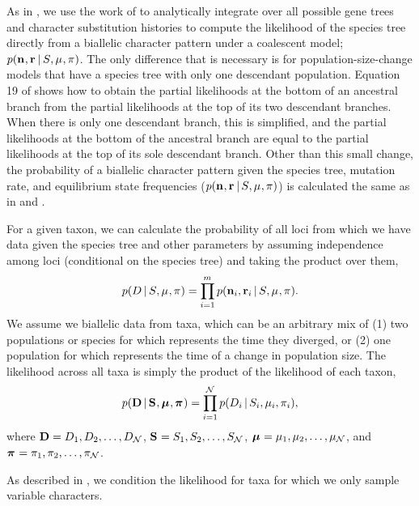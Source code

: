 As in \citet{Oaks2018ecoevolity},
we use the work of \citet{Bryant2012}
to analytically integrate over all possible gene trees and
character substitution histories to compute the likelihood
of the species tree directly from 
a biallelic character pattern under a coalescent model;
$\pr(\leafallelecounts, \leafredallelecounts \given \sptree, \murate, \gfreq)$.
The only difference that is necessary is for population-size-change models that
have a species tree with only one descendant population.
Equation 19 of \citet{Bryant2012} shows how to obtain the partial likelihoods
at the bottom of an ancestral branch from the partial likelihoods at the top of
its two descendant branches.
When there is only one descendant branch, this is simplified, and the partial
likelihoods at the bottom of the ancestral branch are equal to the partial
likelihoods at the top of its sole descendant branch.
Other than this small change, the probability of a biallelic character pattern
given the species tree, mutation rate, and equilibrium state frequencies
($\pr(\leafallelecounts, \leafredallelecounts \given \sptree, \murate, \gfreq)$)
is calculated the same as in \citet{Bryant2012} and \citet{Oaks2018ecoevolity}.


\begin{linenomath}
For a given taxon, we can calculate the probability of all \nloci{} loci
from which we have data given the species tree and other parameters by
assuming independence among loci (conditional on the species tree) and
taking the product over them,
\begin{equation}
    \pr(\comparisondata \given \sptree, \murate, \gfreq)
    =
    \prod_{i=1}^{\nloci}
    \pr(\leafallelecounts[i], \leafredallelecounts[i] \given \sptree, \murate, \gfreq).
    \label{eq:comparisonlikelihood}
\end{equation}
We assume we biallelic data from \ncomparisons{} taxa, which can be an
arbitrary mix of
(1) two populations or species for which \comparisondivtime represents
the time they diverged, or
(2) one population for which \comparisondivtime represents the time
of a change in population size.
The likelihood across all \ncomparisons{} taxa is simply the product of the
likelihood of each taxon,
\begin{equation}
    \pr(
    \alldata
    \given
    \sptrees,
    \murates,
    \gfreqs)
    =
    \prod_{i=1}^{\ncomparisons}
    \pr(\comparisondata[i] \given \sptree[i], \murate[i], \gfreq[i]),
    \label{eq:collectionlikelihood}
\end{equation}
where
$\alldata = \comparisondata[1], \comparisondata[2], \ldots, \comparisondata[\ncomparisons]$,
$\sptrees = \sptree[1], \sptree[2], \ldots, \sptree[\ncomparisons]$,
$\murates = \murate[1], \murate[2], \ldots, \murate[\ncomparisons]$,
and
$\gfreqs = \gfreq[1], \gfreq[2], \ldots, \gfreq[\ncomparisons]$.
\end{linenomath}
As described in \citet{Oaks2018ecoevolity}, we condition the likelihood
for taxa for which we only sample variable characters.


